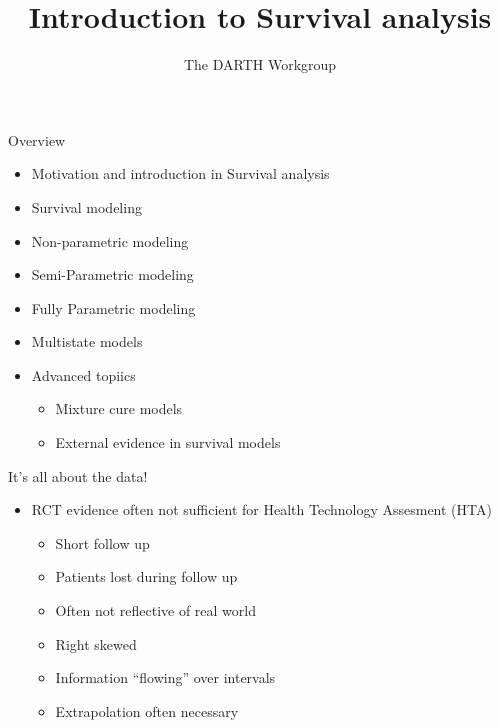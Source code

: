 \documentclass[
  ignorenonframetext,
]{beamer}
\title{Introduction to Survival analysis}
\subtitle{The DARTH Workgroup}
\author{}
\date{\vspace{-2.5em}}
\providecommand{\tightlist}{%
  \setlength{\itemsep}{0pt}\setlength{\parskip}{0pt}}
\begin{document}
\frame{\titlepage}

\begin{frame}{Overview}
\protect\hypertarget{overview}{}

\begin{itemize}
\tightlist
\item
  Motivation and introduction in Survival analysis
\item
  Survival modeling
\item
  Non-parametric modeling
\item
  Semi-Parametric modeling
\item
  Fully Parametric modeling
\item
  Multistate models
\item
  Advanced topiics

  \begin{itemize}
  \tightlist
  \item
    Mixture cure models
  \item
    External evidence in survival models
  \end{itemize}
\end{itemize}

\end{frame}

\begin{frame}{It's all about the data!}
\protect\hypertarget{its-all-about-the-data}{}

\begin{itemize}
\tightlist
\item
  RCT evidence often not sufficient for Health Technology Assesment
  (HTA)

  \begin{itemize}
  \tightlist
  \item
    Short follow up
  \item
    Patients lost during follow up
  \item
    Often not reflective of real world
  \item
    Right skewed\\
  \item
    Information ``flowing'' over intervals
  \item
    Extrapolation often necessary
  \end{itemize}
\end{itemize}

\end{frame}
\end{document}
